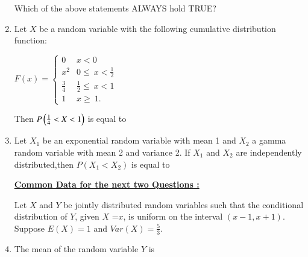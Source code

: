\documentclass[journal,12pt,twocolumn]{IEEEtran}
\begin{document}
\begin{enumerate}
Which of the above statements ALWAYS hold TRUE?
\begin{enumerate}
\end{enumerate}

 
\item Let $X$ be a random variable with the following cumulative distribution function: 

\begin{center}
$ 
F(x)=
\begin{cases}
0 & x<0 \\
x^2 & 0\leq\ x <\frac{1}{2}\\
\frac{3}{4} & \frac{1}{2}\leq\ x<1\\
1 & x\geq\ 1.
\end{cases}
$\\ 

\end{center}
Then $P\left(\frac{1}{4}<X<1\right)$ is equal to \underline{\hspace{3cm}}
\\
 


\item Let $X_1$ be an exponential random variable with mean 1 and $X_2$ a gamma random variable with mean 2 and variance 2. If $X_1$ and $X_2$ are independently distributed,then $P(X_1<X_2)$ is equal to \underline{\hspace{3cm}}
\\
\solution

\begin{center}
\centering\underline{\textbf{Common Data for the next two Questions :}}
\end{center}


Let $X$ and $Y$ be jointly distributed random variables such that the conditional distribution of $Y$, given $X$ =$x$, is uniform on the interval $(x-1,x+1)$. Suppose $E(X)=1$ and $Var(X)=\frac{5}{3}$.
\\
\item The mean of the random variable $Y$ is 
\\
\begin{enumerate}
\begin{multicols}{2}
\setlength\itemsep{2em}


\end{multicols}
\end{enumerate}
\end{enumerate}
\end{document}
